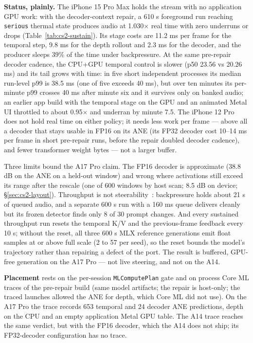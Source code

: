 \documentclass[11pt]{article}
\newcommand{\code}[1]{\texttt{#1}}
\begin{document}
\textbf{Status, plainly.} The iPhone 15 Pro Max holds the stream with no application GPU work: with the decoder-context repair, a 610 s foreground run reaching \code{serious} thermal state produces audio at 1.030$\times$ real time with zero underruns or drops (Table~\ref{tab:cs2-sustain}). Its stage costs are 11.2 ms per frame for the temporal step, 9.8 ms for the depth rollout and 2.3 ms for the decoder, and the producer sleeps 39\% of the time under backpressure. At the same pre-repair decoder cadence, the CPU+GPU temporal control is slower (p50 23.56 vs 20.26 ms) and its tail grows with time: in five short independent processes its median run-level p99 is 38.5 ms (one of five exceeds 40 ms), but over ten minutes its per-minute p99 crosses 40 ms after minute six and it survives only on banked audio; an earlier app build with the temporal stage on the GPU and an animated Metal UI throttled to about 0.95$\times$ and underran by minute 7.5. The iPhone 12 Pro does not hold real time on either policy; it needs less work per frame --- above all a decoder that stays usable in FP16 on its ANE (its FP32 decoder cost 10--14 ms per frame in short pre-repair runs, before the repair doubled decoder cadence), and fewer transformer weight bytes --- not a larger buffer.

Three limits bound the A17 Pro claim. The FP16 decoder is approximate (38.8 dB on the ANE on a held-out window) and wrong where activations still exceed its range after the rescale (one of 600 windows by host scan; 8.5 dB on device; \S\ref{sec:cs2-layout}). Throughput is not steerability~\citep{mrt2-three-clocks}: backpressure holds about 21 s of queued audio, and a separate 600 s run with a 160 ms queue delivers cleanly but its frozen detector finds only 8 of 30 prompt changes. And every sustained throughput run resets the temporal K/V and the previous-frame feedback every 10 s; without the reset, all three 600 s MLX reference generations emit float samples at or above full scale (2 to 57 per seed), so the reset bounds the model's trajectory rather than repairing a defect of the port. The result is buffered, GPU-free generation on the A17 Pro --- not live steering, and not on the A14.

\textbf{Placement} rests on the per-session \code{MLComputePlan} gate and on process Core ML traces of the pre-repair build (same model artifacts; the repair is host-only; the traced launches allowed the ANE for depth, which Core ML did not use). On the A17 Pro the trace records 653 temporal and 24 decoder ANE predictions, depth on the CPU and an empty application Metal GPU table. The A14 trace reaches the same verdict, but with the FP16 decoder, which the A14 does not ship; its FP32-decoder configuration has no trace.
\end{document}
